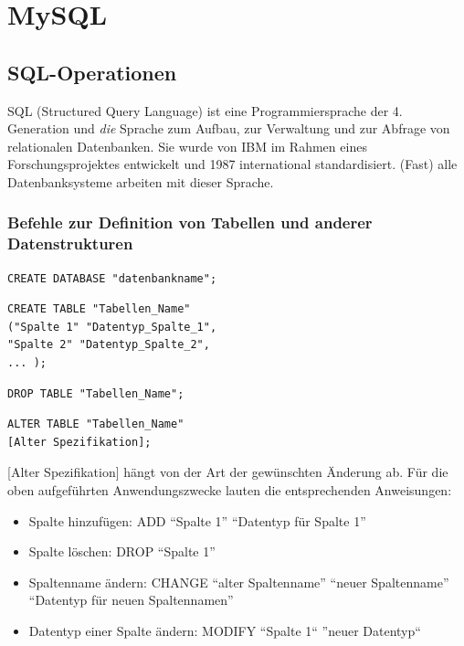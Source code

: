 \documentclass[a4paper,10pt,DIV9, BCOR12mm, oneside,openright,openbib]{scrreprt}
\theoremstyle{definition}
\theoremstyle{plain}
\begin{document}
\section{MySQL}
\lstset{language=SQL}
\subsection{SQL-Operationen}
SQL (Structured Query Language) ist eine Programmiersprache der 4. Generation und \textit{die} Sprache zum Aufbau, zur Verwaltung und zur Abfrage von relationalen Datenbanken. Sie wurde von IBM im Rahmen eines Forschungsprojektes entwickelt und 1987 international standardisiert. (Fast) alle Datenbanksysteme arbeiten mit dieser Sprache.

\subsubsection{Befehle zur Definition von Tabellen und anderer Datenstrukturen}       

\begin{lstlisting}[caption=Databank erzeugen]
 CREATE DATABASE "datenbankname";
\end{lstlisting}

\begin{lstlisting}[caption=Tabelle erzeugen]
CREATE TABLE "Tabellen_Name"
("Spalte 1" "Datentyp_Spalte_1",
"Spalte 2" "Datentyp_Spalte_2",
... );
\end{lstlisting}

\begin{lstlisting}[caption=Tabelle löschen]
DROP TABLE "Tabellen_Name";
\end{lstlisting}

\begin{lstlisting}[caption=Tabellenaufbau ändern]
ALTER TABLE "Tabellen_Name"
[Alter Spezifikation];
\end{lstlisting}
[Alter Spezifikation] hängt von der Art der gewünschten Änderung ab. Für die oben aufgeführten Anwendungszwecke lauten die entsprechenden Anweisungen:
\begin{itemize}
  \item Spalte hinzufügen: ADD ``Spalte 1'' ``Datentyp für Spalte 1''
  \item Spalte löschen: DROP ``Spalte 1''
  \item Spaltenname ändern: CHANGE ``alter Spaltenname'' ``neuer Spaltenname'' ``Datentyp für neuen Spaltennamen''
  \item Datentyp einer Spalte ändern: MODIFY ``Spalte 1`` ''neuer Datentyp``
\end{itemize}
\end{document}
